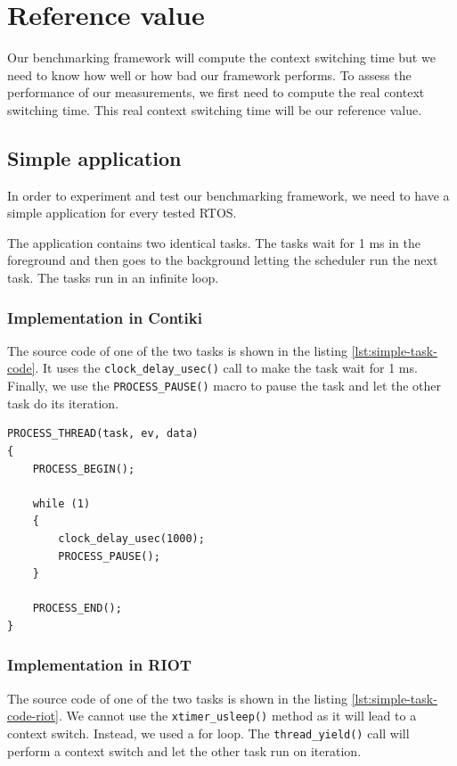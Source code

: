 \section{Reference value \label{sec:reference}}

Our benchmarking framework will compute the context switching time but we need to know how well or how bad our framework performs.
To assess the performance of our measurements, we first need to compute the real context switching time.
This real context switching time will be our reference value.

\subsection{Simple application}
In order to experiment and test our benchmarking framework, we need to have a simple application for every tested RTOS.

The application contains two identical tasks.
The tasks wait for 1 ms in the foreground and then goes to the background letting the scheduler run the next task.
The tasks run in an infinite loop.

\subsubsection{Implementation in Contiki}
The source code of one of the two tasks is shown in the listing \ref{lst:simple-task-code}.
It uses the \texttt{clock\_delay\_usec()} call to make the task wait for 1 ms.
Finally, we use the \texttt{PROCESS\_PAUSE()} macro to pause the task and let the other task do its iteration.

\begin{lstlisting}[style=CStyle, float, label={lst:simple-task-code}, caption={source code of a task implemented in Contiki for the simple application}]
PROCESS_THREAD(task, ev, data)
{
    PROCESS_BEGIN();

    while (1)
    {
        clock_delay_usec(1000);
        PROCESS_PAUSE();
    }

    PROCESS_END();
}
\end{lstlisting}

\subsubsection{Implementation in RIOT}
The source code of one of the two tasks is shown in the listing \ref{lst:simple-task-code-riot}.
We cannot use the \texttt{xtimer\_usleep()} method as it will lead to a context switch.
Instead, we used a for loop.
The \texttt{thread\_yield()} call will perform a context switch and let the other task run on iteration.

